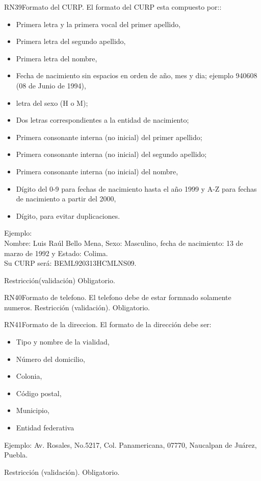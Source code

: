 \begin{BussinesRule}{RN39}{Formato del CURP.}
	\BRitem[Descripción:] El formato del CURP esta compuesto por::
		\begin{itemize}
			\item Primera letra y la primera vocal del primer apellido,
			\item Primera letra del segundo apellido,
			\item Primera letra del nombre,
			\item Fecha de nacimiento sin espacios en orden de año, mes y dia; ejemplo 940608 (08 de Junio de 1994),
			\item letra del sexo (H o M);
			\item Dos letras correspondientes a la entidad de nacimiento;
			\item Primera consonante interna (no inicial) del primer apellido;
			\item Primera consonante interna (no inicial) del segundo apellido;
			\item Primera consonante interna (no inicial) del nombre,
			\item Dígito del 0-9 para fechas de nacimiento hasta el año 1999 y A-Z para fechas de nacimiento a partir del 2000,
			\item Dígito, para evitar duplicaciones.			
		\end{itemize}

Ejemplo:\\
Nombre: Luis Raúl Bello Mena, Sexo: Masculino, fecha de nacimiento: 13 de marzo de 1992 y Estado: Colima.\\
Su CURP será: BEML920313HCMLNS09.

	\BRitem[Tipo:] Restricción(validación)
	\BRitem[Nivel:] Obligatorio.
\end{BussinesRule}


\begin{BussinesRule}{RN40}{Formato de telefono.} 
	\BRitem[Descripción:] El telefono debe de estar formnado solamente numeros.
	\BRitem[Tipo:] Restricción (validación).
	\BRitem[Nivel:] Obligatorio.
\end{BussinesRule}

\begin{BussinesRule}{RN41}{Formato de la direccion.} 
	\BRitem[Descripción:]El formato de la dirección debe ser:
		\begin{itemize}
			\item Tipo y nombre de la vialidad, 
			\item Número del domicilio, 
			\item Colonia, 
			\item Código postal, 
			\item Municipio, 
			\item Entidad federativa
		\end{itemize}
	Ejemplo: Av. Rosales, No.5217, Col. Panamericana, 07770, Naucalpan de Juárez, Puebla.	
	
	\BRitem[Tipo:] Restricción (validación).
	\BRitem[Nivel:] Obligatorio.
\end{BussinesRule}

